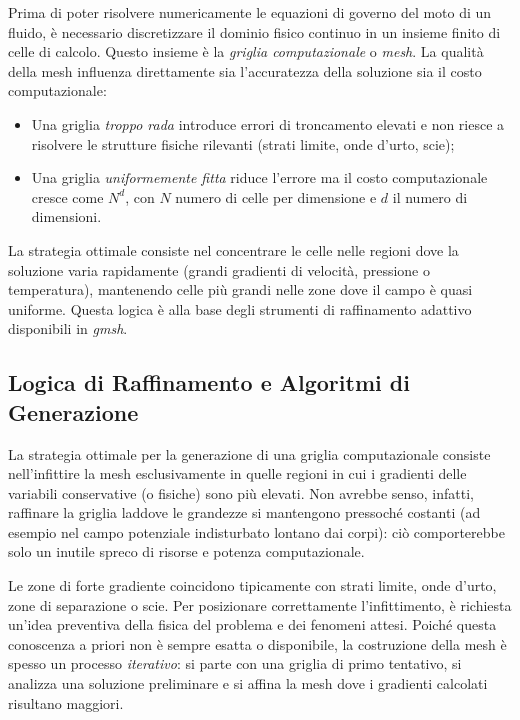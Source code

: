 Prima di poter risolvere numericamente le equazioni di governo del moto di un fluido, è
necessario discretizzare il dominio fisico continuo in un insieme finito di celle di calcolo.
Questo insieme è la \emph{griglia computazionale} o \emph{mesh}. La qualità della mesh influenza
direttamente sia l'accuratezza della soluzione sia il costo computazionale:
\begin{itemize}
  \item Una griglia \emph{troppo rada} introduce errori di troncamento elevati e non riesce a
    risolvere le strutture fisiche rilevanti (strati limite, onde d'urto, scie);
  \item Una griglia \emph{uniformemente fitta} riduce l'errore ma il costo computazionale cresce
    come $N^d$, con $N$ numero di celle per dimensione e $d$ il numero di dimensioni.
\end{itemize}

La strategia ottimale consiste nel concentrare le celle nelle regioni dove la soluzione varia
rapidamente (grandi gradienti di velocità, pressione o temperatura), mantenendo celle più grandi
nelle zone dove il campo è quasi uniforme. Questa logica è alla base degli strumenti di
raffinamento adattivo disponibili in \textit{gmsh}.

\subsection{Logica di Raffinamento e Algoritmi di Generazione}

La strategia ottimale per la generazione di una griglia computazionale consiste nell'infittire la mesh esclusivamente in quelle regioni in cui i gradienti delle variabili conservative (o fisiche) sono più elevati. Non avrebbe senso, infatti, raffinare la griglia laddove le grandezze si mantengono pressoché costanti (ad esempio nel campo potenziale indisturbato lontano dai corpi): ciò comporterebbe solo un inutile spreco di risorse e potenza computazionale. 

Le zone di forte gradiente coincidono tipicamente con strati limite, onde d'urto, zone di separazione o scie. Per posizionare correttamente l'infittimento, è richiesta un'idea preventiva della fisica del problema e dei fenomeni attesi. Poiché questa conoscenza a priori non è sempre esatta o disponibile, la costruzione della mesh è spesso un processo \emph{iterativo}: si parte con una griglia di primo tentativo, si analizza una soluzione preliminare e si affina la mesh dove i gradienti calcolati risultano maggiori.

